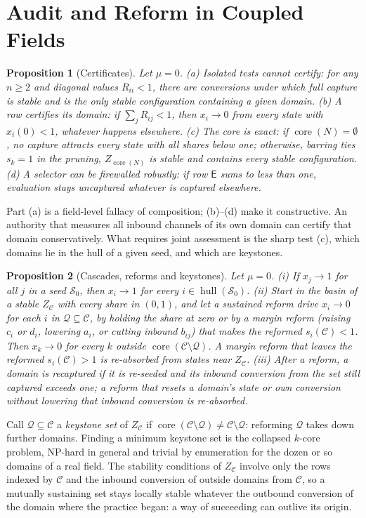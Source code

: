 \documentclass[letterpaper]{article} %
\newtheorem{proposition}{Proposition}
\theoremstyle{definition}
\newcommand{\hull}{\operatorname{hull}}
\newcommand{\core}{\operatorname{core}}
\newcommand{\dE}{\mathsf{E}}
\newcommand{\cC}{\mathcal{C}}
\newcommand{\cQ}{\mathcal{Q}}
\newcommand{\cS}{\mathcal{S}}
\begin{document}
\section{Audit and Reform in Coupled Fields}\label{sec:field}

\begin{proposition}[Certificates]\label{prop:cert}
Let $\mu=0$. (a) Isolated tests cannot certify: for any $n\ge2$ and diagonal values $R_{ii}<1$, there are conversions under which full capture is stable and is the only stable configuration containing a given domain. (b) A row certifies its domain: if $\sum_jR_{ij}<1$, then $x_i\to0$ from every state with $x_i(0)<1$, whatever happens elsewhere. (c) The core is exact: if $\core(N)=\emptyset$, no capture attracts every state with all shares below one; otherwise, barring ties $s_k=1$ in the pruning, $Z_{\core(N)}$ is stable and contains every stable configuration. (d) A selector can be firewalled robustly: if row $\dE$ sums to less than one, evaluation stays uncaptured whatever is captured elsewhere.
\end{proposition}

Part (a) is a field-level fallacy of composition; (b)--(d) make it constructive. An authority that measures all inbound channels of its own domain can certify that domain conservatively. What requires joint assessment is the sharp test (c), which domains lie in the hull of a given seed, and which are keystones.

\begin{proposition}[Cascades, reforms and keystones]\label{prop:reform}
Let $\mu=0$. (i) If $x_j\to1$ for all $j$ in a seed $\cS_0$, then $x_i\to1$ for every $i\in\hull(\cS_0)$. (ii) Start in the basin of a stable $Z_\cC$ with every share in $(0,1)$, and let a sustained reform drive $x_i\to0$ for each $i$ in $\cQ\subseteq\cC$, by holding the share at zero or by a margin reform (raising $c_i$ or $d_i$, lowering $a_i$, or cutting inbound $b_{ij}$) that makes the reformed $s_i(\cC)<1$. Then $x_k\to0$ for every $k$ outside $\core(\cC\setminus\cQ)$. A margin reform that leaves the reformed $s_i(\cC)>1$ is re-absorbed from states near $Z_\cC$. (iii) After a reform, a domain is recaptured if it is re-seeded and its inbound conversion from the set still captured exceeds one; a reform that resets a domain's state or own conversion without lowering that inbound conversion is re-absorbed.
\end{proposition}

Call $\cQ\subseteq\cC$ a \emph{keystone set} of $Z_\cC$ if $\core(\cC\setminus\cQ)\neq\cC\setminus\cQ$: reforming $\cQ$ takes down further domains. Finding a minimum keystone set is the collapsed $k$-core problem, NP-hard in general \citep{zhang2017collapsed,bhawalkar2015} and trivial by enumeration for the dozen or so domains of a real field. The stability conditions of $Z_\cC$ involve only the rows indexed by $\cC$ and the inbound conversion of outside domains from $\cC$, so a mutually sustaining set stays locally stable whatever the outbound conversion of the domain where the practice began: a way of succeeding can outlive its origin.
\end{document}
